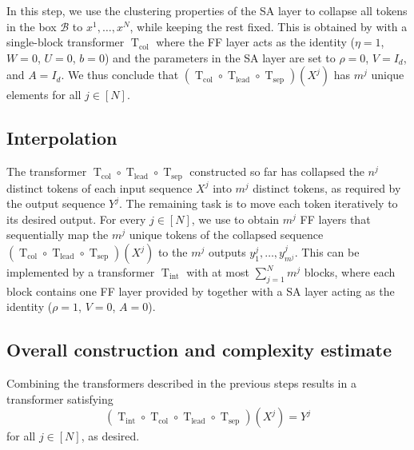 \documentclass[pdflatex,sn-mathphys-num]{sn-jnl}%
\theoremstyle{thmstyleone}%
\theoremstyle{thmstyletwo}%
\theoremstyle{thmstylethree}%
\numberwithin{equation}{section}
\DeclareMathOperator{\T}{\mathrm{T}}
\begin{document}
In this step, we use the clustering properties of the SA layer to collapse all tokens in the box $\mathcal{B}$ to $x^1, \dots, x^N$, while keeping the rest fixed. This is obtained by  with a single-block transformer $\T_{\text{col}}$ where the FF layer acts as the identity ($\eta = 1$, $W = 0$, $U = 0$, $b = 0$) and the parameters in the SA layer are set to $\rho = 0$, $V = I_d$, and $A = I_d$. We thus conclude that $(\T_\text{col} \circ \T_\text{lead} \circ \T_\text{sep}) (X^j)$ has $m^j$ unique elements for all $j\in [N]$.

\subsection{Interpolation}\label{ss:interpolationStep}

The transformer $\T_\text{col} \circ \T_\text{lead} \circ \T_\text{sep}$ constructed so far has collapsed the $n^j$ distinct tokens of each input sequence $X^j$ into $m^j$ distinct tokens, as required by the output sequence $Y^j$. The remaining task is to move each token iteratively to its desired output. For every $j \in [N]$, we use  to obtain $m^j$ FF layers that sequentially map the $m^j$ unique tokens of the collapsed sequence $(\T_\text{col} \circ \T_\text{lead} \circ \T_\text{sep}) (X^j)$ to the $m^j$ outputs $y_1^j, \dots, y_{m^j}^j$. This can be implemented by a transformer $\T_{\text{int}}$ with at most $\sum_{j=1}^N m^j$ blocks, where each block contains one FF layer provided by  together with a SA layer acting as the identity ($\rho = 1$, $V = 0$, $A = 0$). 

\subsection{Overall construction and complexity estimate}\label{ss:complexityEstimate}

Combining the transformers described in the previous steps results in a transformer satisfying 
$$
(\T_{\text{int}} \circ \T_{\text{col}}\circ \T_{\text{lead}} \circ \T_{\text{sep}})(X^j) = Y^j
$$
for all $j\in [N]$, as desired.
\end{document}
